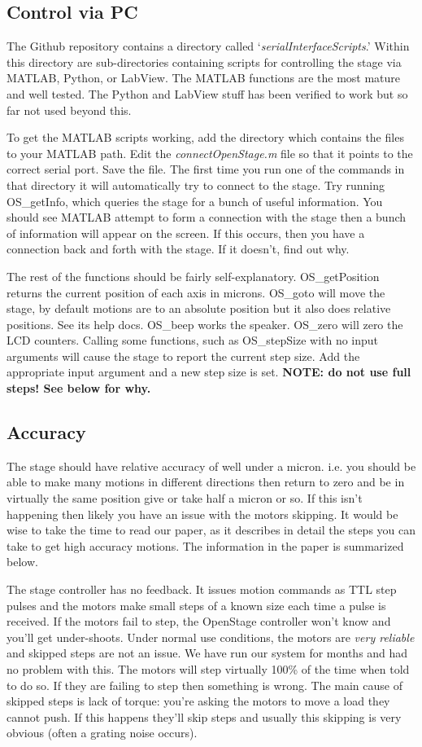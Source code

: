 \documentclass[11pt]{report} %
\begin{document}
\subsection{Control via PC}
The Github repository contains a directory called `\textit{serialInterfaceScripts}.' Within this directory are sub-directories containing scripts for controlling the stage via MATLAB, Python, or LabView. The MATLAB functions are the most mature and well tested. The Python and LabView stuff has been verified to work but so far not used beyond this. 

To get the MATLAB scripts working, add the directory which contains the files to your MATLAB path. Edit the \textit{connectOpenStage.m} file so that it points to the correct serial port. Save the file. The first time you run one of the commands in that directory it will automatically try to connect to the stage. Try running OS\_getInfo, which queries the stage for a bunch of useful information. You should see MATLAB attempt to form a connection with the stage then a bunch of information will appear on the screen. If this occurs, then you have a connection back and forth with the stage. If it doesn't, find out why. 

The rest of the functions should be fairly self-explanatory. OS\_getPosition returns the current position of each axis in microns. OS\_goto will move the stage, by default motions are to an absolute position but it also does relative positions. See its help docs. OS\_beep works the speaker. OS\_zero will zero the LCD counters. Calling some functions, such as OS\_stepSize with no input arguments will cause the stage to report the current step size. Add the appropriate input argument and a new step size is set. \textbf{NOTE: do not use full steps! See below for why.}

\subsection{Accuracy}
The stage should have relative accuracy of well under a micron. i.e. you should be able to make many motions in different directions then return to zero and be in virtually the same position give or take half a micron or so. If this isn't happening then likely you have an issue with the motors skipping. It would be wise to take the time to read our paper, as it describes in detail the steps you can take to get high accuracy motions. The information in the paper is summarized below. 

The stage controller has no feedback. It issues motion commands as TTL step pulses and the motors make small steps of a known size each time a pulse is received. If the motors fail to step, the OpenStage controller won't know and you'll get under-shoots. Under normal use conditions, the motors are \textit{very reliable} and skipped steps are not an issue. We have run our system for months and had no problem with this. The motors will step virtually 100\% of the time when told to do so. If they are failing to step then something is wrong. The main cause of skipped steps is lack of torque: you're asking the motors to move a load they cannot push. If this happens they'll skip steps and usually this skipping is very obvious (often a grating noise occurs). 
\end{document}

